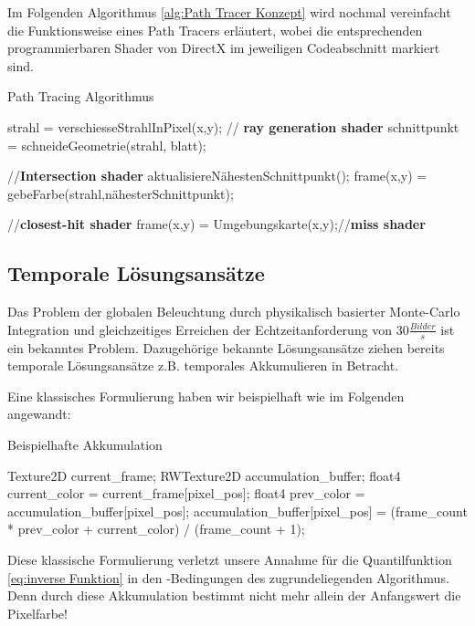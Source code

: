 \newpage
Im Folgenden Algorithmus \ref{alg:Path Tracer Konzept} wird nochmal vereinfacht die Funktionsweise 
eines Path Tracers erläutert, wobei die entsprechenden programmierbaren Shader von DirectX 
im jeweiligen Codeabschnitt markiert sind.

\begin{tcolorbox}
\begin{algorithm}[H]
    \caption{Path Tracing Algorithmus}
    \begin{algorithmic}[1]
        \State strahl = verschiesseStrahlInPixel(x,y); // \textbf{ray generation shader}
        \State schnittpunkt = schneideGeometrie(strahl, blatt);\par
        //\textbf{Intersection shader}
        \State aktualisiereNähestenSchnittpunkt();
        \EndIf
        \EndFor
        \State frame(x,y) = gebeFarbe(strahl,nähesterSchnittpunkt);\par
        //\textbf{closest-hit shader}
        \Else
        \State frame(x,y) = Umgebungskarte(x,y);//\textbf{miss shader}
        \EndIf
        \EndFor
        \EndProcedure
    \end{algorithmic}
    \label{alg:Path Tracer Konzept}
\end{algorithm}
\end{tcolorbox}

\subsection{Temporale Lösungsansätze}
\label{ch:Content1:subsec:Bisherige Temporalansätze}

Das Problem der globalen Beleuchtung durch physikalisch basierter Monte-Carlo Integration und gleichzeitiges Erreichen der 
Echtzeitanforderung von 30$\frac{Bilder}{s}$ ist ein bekanntes Problem. Dazugehörige bekannte Lösungsansätze 
ziehen bereits temporale Lösungsansätze z.B. temporales Akkumulieren \cite{schied2017spatiotemporal} in Betracht. 
\par 

Eine klassisches Formulierung \cite{UE4TAA} haben wir beispielhaft wie im Folgenden angewandt:

\begin{tcolorbox}
  \begin{algorithm}[H]
    \caption{Beispielhafte Akkumulation}
    \begin{algorithmic}[1]
        \State Texture2D current\_frame;
        \State RWTexture2D accumulation\_buffer;
        \State float4 current\_color = current\_frame[pixel\_pos];
        \State float4 prev\_color = accumulation\_buffer[pixel\_pos];
        \State accumulation\_buffer[pixel\_pos] = 
        \State (frame\_count * prev\_color + current\_color) / (frame\_count + 1);
    \end{algorithmic}
    \label{alg:TemporalAccumulation}
\end{algorithm}
\end{tcolorbox}

Diese klassische Formulierung verletzt unsere Annahme für die Quantilfunktion \ref{eq:inverse Funktion}
in den -Bedingungen des zugrundeliegenden Algorithmus. 
Denn durch diese Akkumulation bestimmt nicht mehr allein der Anfangswert die Pixelfarbe!




